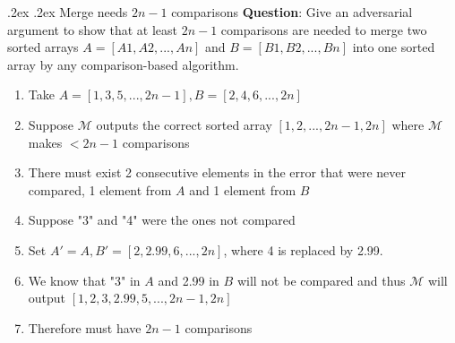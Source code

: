 \documentclass[10pt,landscape,a4paper]{article}
\makeatletter
\renewcommand{\subsubsection}{\@startsection{subsubsection}{1}{0mm}%
    {.2ex}%
    {.2ex}%
    {\rmfamily\bfseries}}
\makeatother
\begin{document}
\begin{multicols*}{4}
	\subsubsection{Merge needs $2n-1$ comparisons}
	\textbf{Question}: Give an adversarial argument to show that at least $2n-1$ comparisons are needed to merge two sorted arrays $A = [A1,A2,...,An]$ and $B = [B1,B2, ...,Bn]$ into one sorted array by any comparison-based algorithm.
	\begin{enumerate}
		\item Take $A=[1,3,5,...,2n-1],B=[2,4,6,...,2n]$
		\item Suppose $\mathcal{M}$ outputs the correct sorted array $[1,2,...,2n-1,2n]$ where $\mathcal{M}$ makes $<2n-1$ comparisons
		\item There must exist 2 consecutive elements in the error that were never compared, 1 element from $A$ and 1 element from $B$
		\item Suppose "3" and "4" were the ones not compared
		\item Set $A'=A,B'=[2,2.99,6,...,2n]$, where 4 is replaced by 2.99.
		\item We know that "3" in $A$ and 2.99 in $B$ will not be compared and thus
		$\mathcal{M}$ will output $[1,2,3,2.99,5,...,2n-1,2n]$
		\item Therefore must have $2n-1$ comparisons
	\end{enumerate}
\end{multicols*}
\end{document}
